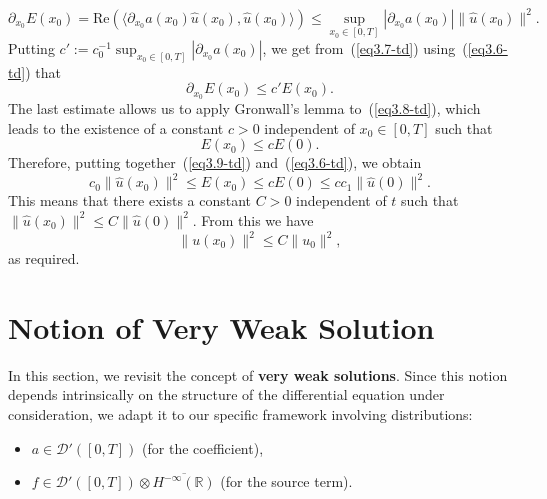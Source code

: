 \documentclass[12pt]{amsart}
\theoremstyle{definition}
\begin{document}
\begin{equation}
\partial_{x_0}E(x_0)=\mathrm{Re}\left(\langle \partial_{x_0}a(x_0)\hat{u}(x_0), \hat{u}(x_0) \rangle \right)\leq \sup_{x_0 \in [0,T]} |\partial_{x_0}a(x_0)| \|\hat{u}(x_0)\|^2.
\label{eq3.7-td}
\end{equation}
Putting $c' := c_0^{-1} \sup_{x_0 \in [0,T]} |\partial_{x_0}a(x_0)|$, we get from~(\ref{eq3.7-td}) using~(\ref{eq3.6-td}) that
\begin{equation}
\partial_{x_0}E(x_0)  \leq c'E(x_0).
\label{eq3.8-td}
\end{equation}
The last estimate allows us to apply Gronwall's lemma to~(\ref{eq3.8-td}), which leads to the existence of a constant $c > 0$ independent of $x_0 \in [0, T]$ such that
\begin{equation}
E(x_0) \leq cE(0).\label{eq3.9-td}
\end{equation}
Therefore, putting together~(\ref{eq3.9-td}) and~(\ref{eq3.6-td}), we obtain
\begin{equation*}
c_0\|\hat{u}(x_0)\|^2 \leq E(x_0) \leq cE(0) \leq cc_1\|\hat{u}(0)\|^2.
\end{equation*}
This means that there exists a constant $C > 0$ independent of $t$ such that $\|\hat{u}(x_0)\|^2 \leq C\|\hat{u}(0)\|^2$. From this we have
\begin{equation*}
\|u(x_0)\|^2  \leq C\|u_0\|^2,
\end{equation*}
as required.

\section{Notion of Very Weak Solution}

In this section, we revisit the concept of \textbf{very weak solutions}. Since this notion depends intrinsically on the structure of the differential equation under consideration, we adapt it to our specific framework involving distributions:
\begin{itemize}
    \item $a \in \mathcal{D}'([0, T])$ (for the coefficient),
    \item $f \in \mathcal{D}'([0, T]) \otimes \overline{H^{-\infty}(\mathbb{R})}$ (for the source term).
\end{itemize}
\end{document}
